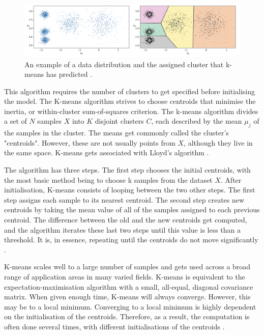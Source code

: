 	\begin{figure}[t]
		\begin{center}
			\includegraphics[width=12cm]{graphics/km_example.png}
			\caption{An example of a data distribution and the assigned cluster that k-means has predicted \cite{geron2019hands}.}
			\label{fig:km_handson_example}
		\end{center}
	\end{figure}
	
	This algorithm requires the number of clusters to get specified before initialising the model. The K-means algorithm strives to choose centroids that minimise the inertia, or within-cluster sum-of-squares criterion. The k-means algorithm divides a set of $N$ samples $X$ into $K$ disjoint clusters $C$, each described by the mean $\mu_j$ of the samples in the cluster. The means get commonly called the cluster's "centroids". However, these are not usually points from $X$, although they live in the same space. K-means gets associated with Lloyd's algorithm \cite{geron2019hands, sklearn_km}. 
	
	The algorithm has three steps. The first step chooses the initial centroids, with the most basic method being to choose k samples from the dataset $X$. After initialisation, K-means consists of looping between the two other steps. The first step assigns each sample to its nearest centroid. The second step creates new centroids by taking the mean value of all of the samples assigned to each previous centroid. The difference between the old and the new centroids get computed, and the algorithm iterates these last two steps until this value is less than a threshold. It is, in essence, repeating until the centroids do not move significantly \cite{geron2019hands, sklearn_km}.
	
	K-means scales well to a large number of samples and gets used across a broad range of application areas in many varied fields. K-means is equivalent to the expectation-maximisation algorithm with a small, all-equal, diagonal covariance matrix. When given enough time, K-means will always converge. However, this may be to a local minimum. Converging to a local minimum is highly dependent on the initialisation of the centroids. Therefore, as a result, the computation is often done several times, with different initialisations of the centroids \cite{sklearn_km}.
	
